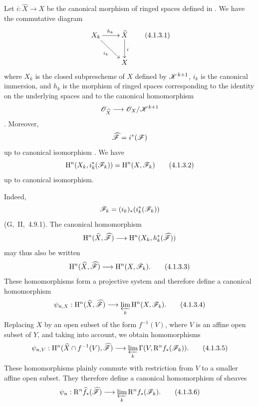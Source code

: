 \begin{env}[4.1.3]
\label{III.4.1.3}
Let $i:\widehat{X}\to X$ be the canonical morphism of ringed spaces
defined in .
We have the commutative diagram
\[
  \xymatrix{
    X_k\ar[r]^{h_k}\ar[dr]_{i_k} &
    \widehat{X}\ar[d]^{i}\\
    & X
  }
  \tag{4.1.3.1}
  \label{III.4.1.3.1}
\]
where $X_k$ is the closed subprescheme of $X$ defined by
$\mathscr{K}^{k+1}$, $i_k$ is the canonical immersion, and $h_k$ is the
morphism of ringed spaces corresponding to the identity on the
underlying spaces and to the canonical homomorphism
\[
  \mathscr{O}_{\widehat{X}}
  \longrightarrow
  \mathscr{O}_X/\mathscr{K}^{k+1}
\]
.
Moreover,
\[
  \widehat{\mathscr{F}}=i^*(\mathscr{F})
\]
up to canonical isomorphism .
We have
\[
  \mathrm{H}^n(X_k,i_k^*(\mathscr{F}_k))
  =
  \mathrm{H}^n(X,\mathscr{F}_k)
  \tag{4.1.3.2}
  \label{III.4.1.3.2}
\]
up to canonical isomorphism.


Indeed,
\[
  \mathscr{F}_k=(i_k)_*(i_k^*(\mathscr{F}_k))
\]
(G,~II,~4.9.1).
The canonical homomorphism
\[
  \mathrm{H}^n(\widehat{X},\widehat{\mathscr{F}})
  \longrightarrow
  \mathrm{H}^n(X_k,h_k^*(\widehat{\mathscr{F}}))
\]
 may thus also be written
\[
  \mathrm{H}^n(\widehat{X},\widehat{\mathscr{F}})
  \longrightarrow
  \mathrm{H}^n(X,\mathscr{F}_k).
  \tag{4.1.3.3}
  \label{III.4.1.3.3}
\]
These homomorphisms form a projective system and therefore define a
canonical homomorphism
\[
  \psi_{n,X}:
  \mathrm{H}^n(\widehat{X},\widehat{\mathscr{F}})
  \longrightarrow
  \varprojlim_k\mathrm{H}^n(X,\mathscr{F}_k).
  \tag{4.1.3.4}
  \label{III.4.1.3.4}
\]
Replacing $X$ by an open subset of the form $f^{-1}(V)$, where $V$ is
an affine open subset of $Y$, and taking  into account,
we obtain homomorphisms
\[
  \psi_{n,V}:
  \mathrm{H}^n(\widehat{X}\cap f^{-1}(V),\widehat{\mathscr{F}})
  \longrightarrow
  \varprojlim_k\Gamma(V,\mathrm{R}^n f_*(\mathscr{F}_k)).
  \tag{4.1.3.5}
  \label{III.4.1.3.5}
\]
These homomorphisms plainly commute with restriction from $V$ to a
smaller affine open subset.
They therefore define a canonical homomorphism of sheaves
\[
  \psi_n:
  \mathrm{R}^n\widehat{f}_*(\widehat{\mathscr{F}})
  \longrightarrow
  \varprojlim_k\mathrm{R}^n f_*(\mathscr{F}_k).
  \tag{4.1.3.6}
  \label{III.4.1.3.6}
\]
\end{env}

